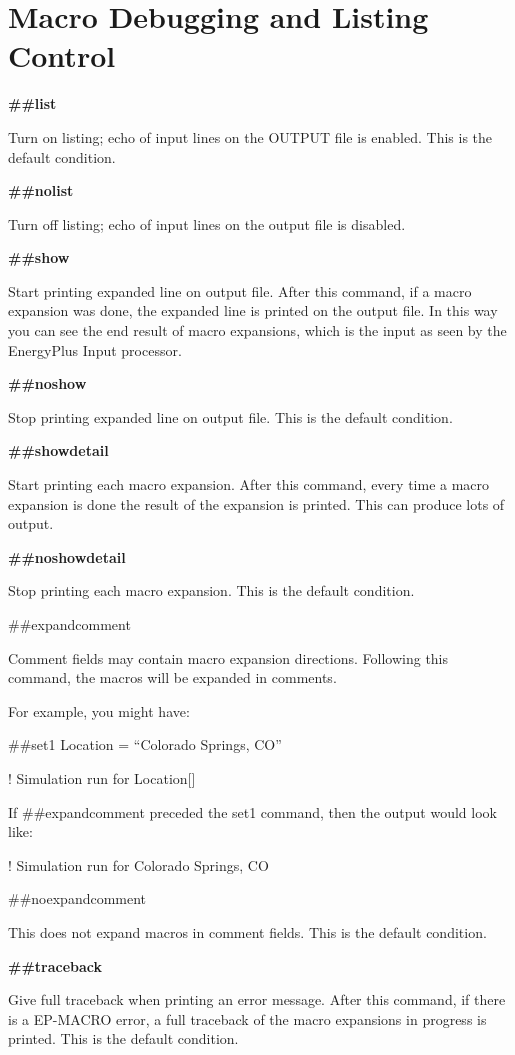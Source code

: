 \section{Macro Debugging and Listing Control}\label{macro-debugging-and-listing-control}

\textbf{\#\#list}

Turn on listing; echo of input lines on the OUTPUT file is enabled. This is the default condition.

\textbf{\#\#nolist}

Turn off listing; echo of input lines on the output file is disabled.

\textbf{\#\#show}

Start printing expanded line on output file. After this command, if a macro expansion was done, the expanded line is printed on the output file. In this way you can see the end result of macro expansions, which is the input as seen by the EnergyPlus Input processor.

\textbf{\#\#noshow}

Stop printing expanded line on output file. This is the default condition.

\textbf{\#\#showdetail}

Start printing each macro expansion. After this command, every time a macro expansion is done the result of the expansion is printed. This can produce lots of output.

\textbf{\#\#noshowdetail}

Stop printing each macro expansion. This is the default condition.

\#\#expandcomment

Comment fields may contain macro expansion directions. Following this command, the macros will be expanded in comments.

For example, you might have:

\#\#set1 Location = ``Colorado Springs, CO''

! Simulation run for Location{[}{]}

If \#\#expandcomment preceded the set1 command, then the output would look like:

! Simulation run for Colorado Springs, CO

\#\#noexpandcomment

This does not expand macros in comment fields. This is the default condition.

\textbf{\#\#traceback}

Give full traceback when printing an error message. After this command, if there is a EP-MACRO error, a full traceback of the macro expansions in progress is printed. This is the default condition.

